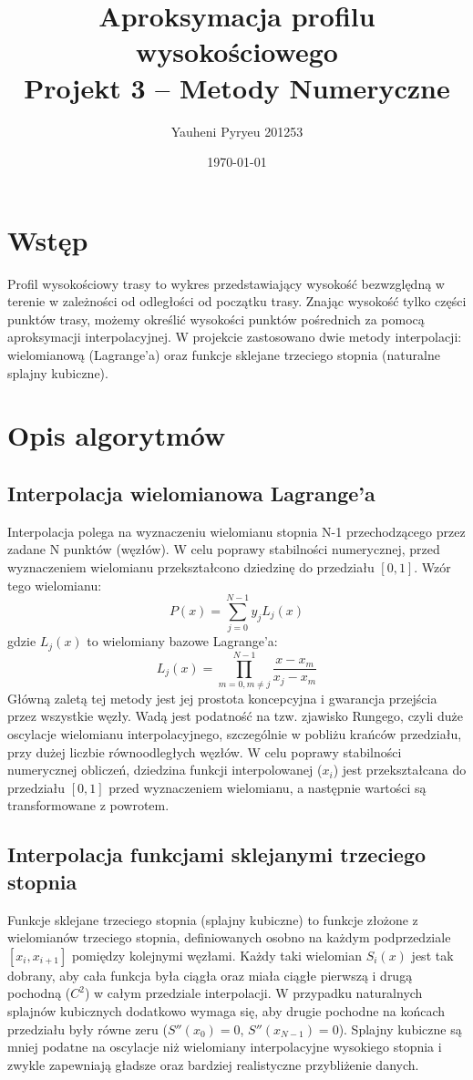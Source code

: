 \documentclass[11pt,a4paper]{article}
\title{Aproksymacja profilu wysokościowego\vspace{0.5em}\\Projekt 3 -- Metody Numeryczne}
\author{Yauheni Pyryeu 201253}
\date{\today}
\begin{document}
\maketitle
\thispagestyle{empty}
\newpage
\tableofcontents
\thispagestyle{empty}
\newpage
\setcounter{page}{1}

\section{Wstęp}
Profil wysokościowy trasy to wykres przedstawiający wysokość bezwzględną w terenie w zależności od odległości od początku trasy. Znając wysokość tylko części punktów trasy, możemy określić wysokości punktów pośrednich za pomocą aproksymacji interpolacyjnej. W projekcie zastosowano dwie metody interpolacji: wielomianową (Lagrange'a) oraz funkcje sklejane trzeciego stopnia (naturalne splajny kubiczne).

\section{Opis algorytmów}
\subsection{Interpolacja wielomianowa Lagrange'a}
Interpolacja polega na wyznaczeniu wielomianu stopnia N-1 przechodzącego przez zadane N punktów (węzłów). W celu poprawy stabilności numerycznej, przed wyznaczeniem wielomianu przekształcono dziedzinę do przedziału $[0,1]$. Wzór tego wielomianu:
\[ P(x) = \sum_{j=0}^{N-1} y_j L_j(x) \]
gdzie $L_j(x)$ to wielomiany bazowe Lagrange'a:
\[ L_j(x) = \prod_{m=0, m \neq j}^{N-1} \frac{x - x_m}{x_j - x_m} \]
Główną zaletą tej metody jest jej prostota koncepcyjna i gwarancja przejścia przez wszystkie węzły. Wadą jest podatność na tzw. zjawisko Rungego, czyli duże oscylacje wielomianu interpolacyjnego, szczególnie w pobliżu krańców przedziału, przy dużej liczbie równoodległych węzłów. W celu poprawy stabilności numerycznej obliczeń, dziedzina funkcji interpolowanej ($x_i$) jest przekształcana do przedziału $[0,1]$ przed wyznaczeniem wielomianu, a następnie wartości są transformowane z powrotem.

\subsection{Interpolacja funkcjami sklejanymi trzeciego stopnia}
Funkcje sklejane trzeciego stopnia (splajny kubiczne) to funkcje złożone z wielomianów trzeciego stopnia, definiowanych osobno na każdym podprzedziale $[x_i, x_{i+1}]$ pomiędzy kolejnymi węzłami. Każdy taki wielomian $S_i(x)$ jest tak dobrany, aby cała funkcja była ciągła oraz miała ciągłe pierwszą i drugą pochodną ($C^2$) w całym przedziale interpolacji. W przypadku naturalnych splajnów kubicznych dodatkowo wymaga się, aby drugie pochodne na końcach przedziału były równe zeru ($S''(x_0) = 0$, $S''(x_{N-1}) = 0$). Splajny kubiczne są mniej podatne na oscylacje niż wielomiany interpolacyjne wysokiego stopnia i zwykle zapewniają gładsze oraz bardziej realistyczne przybliżenie danych.
\end{document}
